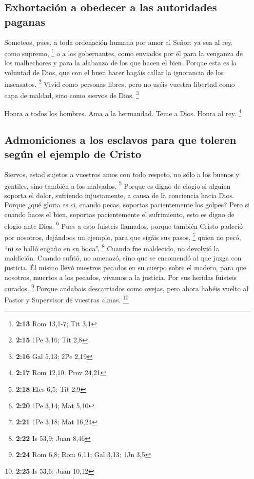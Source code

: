\begin{paracol}{2}
\hypertarget{exhortaciuxf3n-a-obedecer-a-las-autoridades-paganas}{%
\subsection{Exhortación a obedecer a las autoridades
paganas}\label{exhortaciuxf3n-a-obedecer-a-las-autoridades-paganas}}

 Someteos, pues, a toda ordenación humana por amor al
Señor: ya sea al rey, como supremo, \footnote{\textbf{2:13} Rom 13,1-7;
  Tit 3,1}  o a los gobernantes, como enviados por él
para la venganza de los malhechores y para la alabanza de los que hacen
el bien.  Porque esta es la voluntad de Dios, que con el
buen hacer hagáis callar la ignorancia de los insensatos. \footnote{\textbf{2:15}
  1Pe 3,16; Tit 2,8}  Vivid como personas libres, pero no
uséis vuestra libertad como capa de maldad, sino como siervos de Dios.
\footnote{\textbf{2:16} Gal 5,13; 2Pe 2,19}

 Honra a todos los hombres. Ama a la hermandad. Teme a
Dios. Honra al rey. \footnote{\textbf{2:17} Rom 12,10; Prov 24,21}

\hypertarget{admoniciones-a-los-esclavos-para-que-toleren-seguxfan-el-ejemplo-de-cristo}{%
\subsection{Admoniciones a los esclavos para que toleren según el
ejemplo de
Cristo}\label{admoniciones-a-los-esclavos-para-que-toleren-seguxfan-el-ejemplo-de-cristo}}

 Siervos, estad sujetos a vuestros amos con todo respeto,
no sólo a los buenos y gentiles, sino también a los malvados.
\footnote{\textbf{2:18} Efes 6,5; Tit 2,9}  Porque es
digno de elogio si alguien soporta el dolor, sufriendo injustamente, a
causa de la conciencia hacia Dios.  Porque ¿qué gloria es
si, cuando pecas, soportas pacientemente los golpes? Pero si cuando
haces el bien, soportas pacientemente el sufrimiento, esto es digno de
elogio ante Dios. \footnote{\textbf{2:20} 1Pe 3,14; Mat 5,10}
 Pues a esto fuisteis llamados, porque también Cristo
padeció por nosotros, dejándoos un ejemplo, para que sigáis sus pasos,
\footnote{\textbf{2:21} 1Pe 3,18; Mat 16,24}  quien no
pecó, ``ni se halló engaño en su boca''. \footnote{\textbf{2:22} Is
  53,9; Juan 8,46}  Cuando fue maldecido, no devolvió la
maldición. Cuando sufrió, no amenazó, sino que se encomendó al que juzga
con justicia.  Él mismo llevó nuestros pecados en su
cuerpo sobre el madero, para que nosotros, muertos a los pecados,
vivamos a la justicia. Por sus heridas fuisteis curados. \footnote{\textbf{2:24}
  Rom 6,8; Rom 6,11; Gal 3,13; 1Jn 3,5}  Porque andabais
descarriados como ovejas, pero ahora habéis vuelto al Pastor y
Supervisor de vuestras almas. \footnote{\textbf{2:25} Is 53,6; Juan
  10,12}


\end{paracol}
